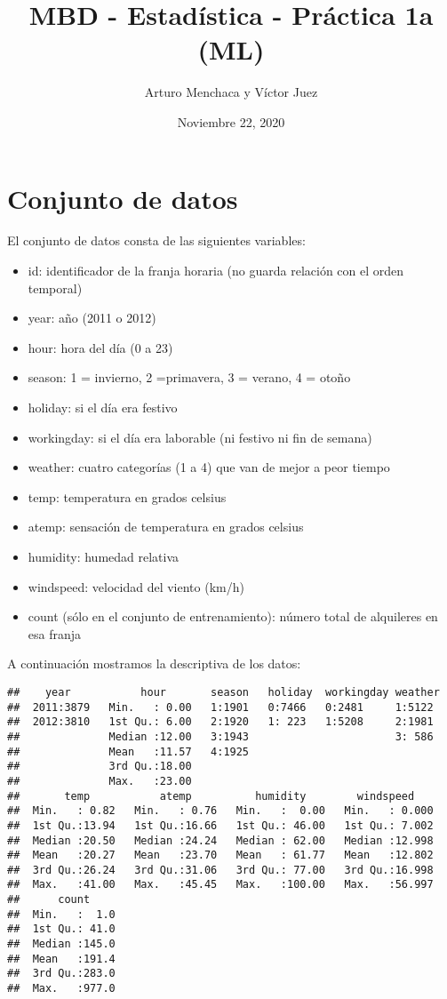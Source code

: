 \documentclass[
]{article}
\title{MBD - Estadística - Práctica 1a (ML)}
\author{Arturo Menchaca y Víctor Juez}
\date{Noviembre 22, 2020}
\providecommand{\tightlist}{%
  \setlength{\itemsep}{0pt}\setlength{\parskip}{0pt}}
\begin{document}
\maketitle

\newpage
\tableofcontents
\newpage

\hypertarget{conjunto-de-datos}{%
\section{Conjunto de datos}\label{conjunto-de-datos}}

El conjunto de datos consta de las siguientes variables:

\begin{itemize}
\tightlist
\item
  id: identificador de la franja horaria (no guarda relación con el
  orden temporal)
\item
  year: año (2011 o 2012)
\item
  hour: hora del día (0 a 23)
\item
  season: 1 = invierno, 2 =primavera, 3 = verano, 4 = otoño
\item
  holiday: si el día era festivo
\item
  workingday: si el día era laborable (ni festivo ni fin de semana)
\item
  weather: cuatro categorías (1 a 4) que van de mejor a peor tiempo
\item
  temp: temperatura en grados celsius
\item
  atemp: sensación de temperatura en grados celsius
\item
  humidity: humedad relativa
\item
  windspeed: velocidad del viento (km/h)
\item
  count (sólo en el conjunto de entrenamiento): número total de
  alquileres en esa franja
\end{itemize}

A continuación mostramos la descriptiva de los datos:

\begin{verbatim}
##    year           hour       season   holiday  workingday weather 
##  2011:3879   Min.   : 0.00   1:1901   0:7466   0:2481     1:5122  
##  2012:3810   1st Qu.: 6.00   2:1920   1: 223   1:5208     2:1981  
##              Median :12.00   3:1943                       3: 586  
##              Mean   :11.57   4:1925                               
##              3rd Qu.:18.00                                        
##              Max.   :23.00                                        
##       temp           atemp          humidity        windspeed     
##  Min.   : 0.82   Min.   : 0.76   Min.   :  0.00   Min.   : 0.000  
##  1st Qu.:13.94   1st Qu.:16.66   1st Qu.: 46.00   1st Qu.: 7.002  
##  Median :20.50   Median :24.24   Median : 62.00   Median :12.998  
##  Mean   :20.27   Mean   :23.70   Mean   : 61.77   Mean   :12.802  
##  3rd Qu.:26.24   3rd Qu.:31.06   3rd Qu.: 77.00   3rd Qu.:16.998  
##  Max.   :41.00   Max.   :45.45   Max.   :100.00   Max.   :56.997  
##      count      
##  Min.   :  1.0  
##  1st Qu.: 41.0  
##  Median :145.0  
##  Mean   :191.4  
##  3rd Qu.:283.0  
##  Max.   :977.0
\end{verbatim}
\end{document}
